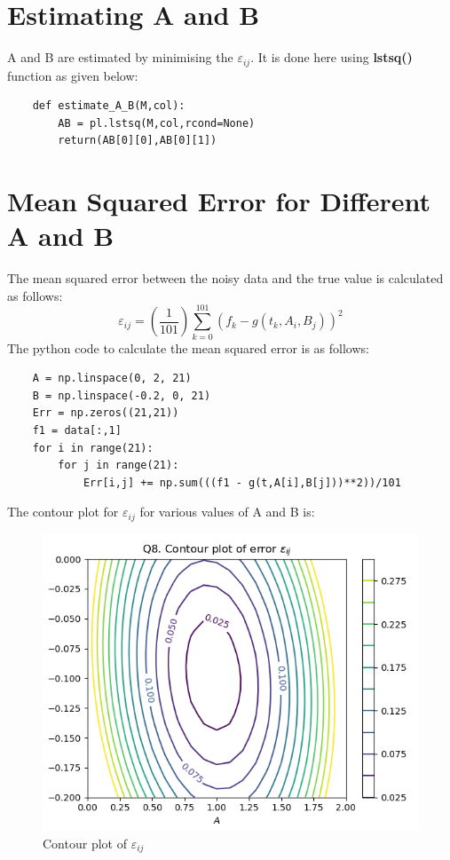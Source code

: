 \documentclass[11pt, a4paper]{article}
\begin{document}
\section{Estimating A and B}
A and B are estimated by minimising the $\varepsilon_{ij}$. It is done here using \textbf{lstsq()} function as given below:
\begin{verbatim}
    def estimate_A_B(M,col):
        AB = pl.lstsq(M,col,rcond=None)
        return(AB[0][0],AB[0][1])
\end{verbatim}
\section{Mean Squared Error for Different A and B}
The mean squared error between the noisy data and the true value is calculated as follows:
$$\varepsilon_{ij} = (\frac{1}{101})\sum_{k=0}^{101}(f_{k} - g(t_{k},A_{i},B_{j}))^{2}$$
The python code to calculate the mean squared error is as follows:
\begin{verbatim}	
    A = np.linspace(0, 2, 21)
    B = np.linspace(-0.2, 0, 21)
    Err = np.zeros((21,21))
    f1 = data[:,1]
    for i in range(21):
        for j in range(21):
            Err[i,j] += np.sum(((f1 - g(t,A[i],B[j]))**2))/101
\end{verbatim}
The contour plot for $\varepsilon_{ij}$ for various values of A and B is:
\begin{figure}[!tbh]
   	\centering
   	\includegraphics[scale=0.6]{Contour.png}   
   	\caption{Contour plot of $\varepsilon_{ij}$}
   	\label{fig:Figure 4}
\end{figure} 
     
\end{document}
